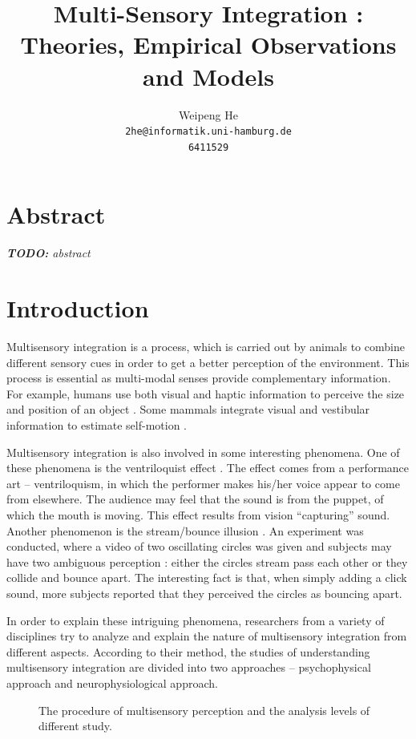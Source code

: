 \documentclass{article}[11pt]
\title{Multi-Sensory Integration : Theories, Empirical Observations and Models}
\author{Weipeng He \\ \texttt{2he@informatik.uni-hamburg.de} \\ \texttt{6411529}}
\newcommand{\inputTikZ}[1]{%
}
\newcommand{\TODO}[1]{\emph{\small{{\bf TODO: } #1}}}
\begin{document}
\maketitle

\section*{Abstract}
\TODO{abstract}


\section{Introduction}
\label{sec:intro}

Multisensory integration is a process, which is carried out by animals to combine different sensory cues in order to get a better perception of the environment. This process is essential as multi-modal senses provide complementary information.
For example, humans use both visual and haptic information to perceive the size and position of an object \cite{ernst_humans_2002}. Some mammals integrate visual and vestibular information to estimate self-motion \cite{fetsch_dynamic_2009}.

Multisensory integration is also involved in some interesting phenomena. One of these phenomena is the ventriloquist effect \cite{alais_ventriloquist_2004}. The effect comes from a performance art -- ventriloquism, in which the performer makes his/her voice appear to come from elsewhere. The audience may feel that the sound is from the puppet, of which the mouth is moving. This effect results from vision ``capturing'' sound.
Another phenomenon is the stream/bounce illusion \cite{sekuler_sound_1997}. An experiment was conducted, where a video of two oscillating circles was given and subjects may have two ambiguous perception : either the circles stream pass each other or they collide and bounce apart. The interesting fact is that, when simply adding a click sound, more subjects reported that they perceived the circles as bouncing apart.

In order to explain these intriguing phenomena, researchers from a variety of disciplines try to analyze and explain the nature of multisensory integration from different aspects. According to their method, the studies of understanding multisensory integration are divided into two approaches -- psychophysical approach and neurophysiological approach.

\begin{figure}[htpb]
  \centering \inputTikZ{flow}
  \caption{The procedure of multisensory perception and the analysis levels of different study.}
  \label{fig:flow}
\end{figure}
\end{document}
